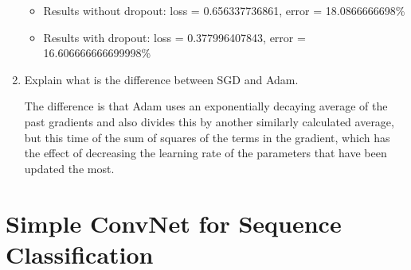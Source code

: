 \documentclass{article} %
\begin{document}
\begin{enumerate}
    \begin{itemize}
        \item
        Results without dropout: loss = 0.656337736861, error = 18.0866666698\%

        \item
        Results with dropout: loss = 0.377996407843, error = 16.606666666699998\%
    \end{itemize}

    \item
    Explain what is the difference between SGD and Adam.

    The difference is that Adam uses an exponentially
    decaying average of the past gradients and also divides this by another similarly
    calculated average, but this time of the sum of squares of the terms in the
    gradient, which has the effect of decreasing the learning rate of the parameters
    that have been updated the most.
\end{enumerate}

\section{Simple ConvNet for Sequence Classification}
\end{document}
